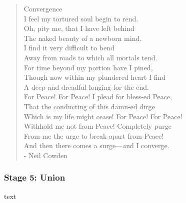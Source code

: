 \begin{quotation}
	\hspace{1.5cm}Convergence\\[5pt]
	\noindent I feel my tortured soul begin to rend. \\
	Oh, pity me, that I have left behind \\
	The naked beauty of a newborn mind. \\
	I find it very difficult to bend \\
	Away from roads to which all mortals tend. \\
	For time beyond my portion have I pined, \\
	Though now within my plundered heart I find \\
	A deep and dreadful longing for the end. \\
	For Peace! For Peace! I plead for bless-ed Peace, \\
	That the conducting of this damn-ed dirge \\
	Which is my life might cease! For Peace! For Peace! \\
	Withhold me not from Peace! Completely purge \\
	From me the urge to break apart from Peace! \\
	And then there comes a surge---and I converge. \\
	
	- Neil Cowden
\end{quotation}

\subsubsection{Stage 5: Union}

text